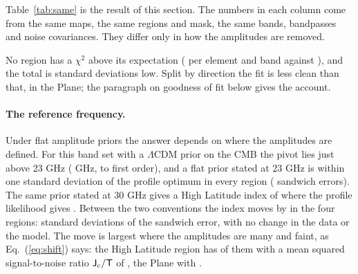 \begin{table}
\centering
\caption{The index of the one-power-law model fitted to the WMAP nine-year K, Ka, Q and V polarization
maps (with Planck PR4 353 GHz for dust) in the four regions of Fig.~\ref{fig:regions}, at $N_{\rm side}=16$ with the dense
noise covariances, all bands brought to a common window, the mask applied, and the $\Lambda$CDM
covariance as the prior on the CMB (). Top: the profile optimum with two errors, the
debiased sandwich error, which assumes one index per region, and a block error from the scatter of
each region's own score over patches of sky, which does not (none is given for the Spur, where fewer
than four patches carry the information); then the answer when the same likelihood is instead
marginalized over flat amplitude priors with the synchrotron amplitude defined at 23 or at 30 GHz, or
under a zero-mean prior with a free scale. Middle: the difference between the two flat-prior answers,
with two first-order predictions of it. Bottom: goodness of fit as $\chi^2$ per element and band, for
which two free amplitudes and a CMB amplitude held by its prior leave an expectation of 0.6 on five
bands.}
\label{tab:same}
\small

\end{table}

Table~\ref{tab:same} is the result of this section. The numbers in each column come from the same
maps, the same regions and mask, the same bands, bandpasses and noise covariances. They differ only
in how the amplitudes are removed.

No region has a $\chi^2$ above its expectation ( per element and band against
), and the total is  standard deviations low. Split by direction the fit is
less clean than that, in the Plane; the paragraph on goodness of fit below gives the account.

\paragraph{The reference frequency.} Under flat amplitude priors the answer depends on where the
amplitudes are defined. For this band set with a $\Lambda$CDM prior on the CMB the pivot lies just
above 23 GHz ( GHz, to first order), and a flat prior stated at 23 GHz is within one
standard deviation of the profile optimum in every region ( sandwich errors). The same
prior stated at 30 GHz gives a High Latitude index of  where the profile likelihood gives
. Between the two conventions the index moves by  in the four regions:
 standard deviations of the sandwich error, with no change in the data or the model.
The move is largest where the amplitudes are many and faint, as Eq.~(\ref{eq:shift}) says: the High
Latitude region has  of them with a mean squared signal-to-noise ratio
$\mathsf{J}_{\rm c}/\mathsf{T}$ of , the Plane  with .

